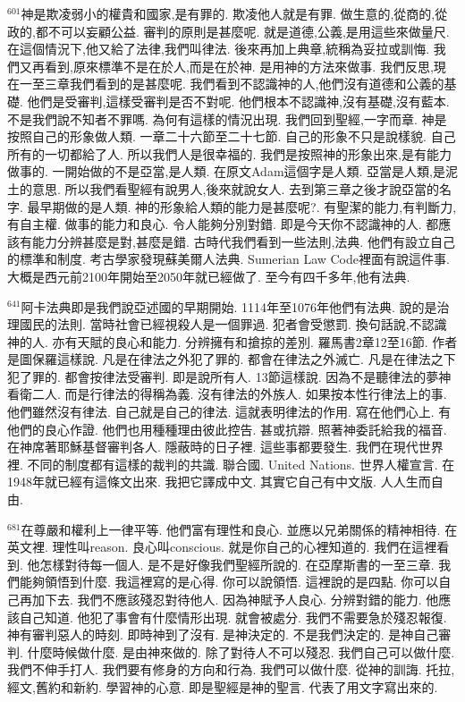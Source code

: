 \documentclass{book}
\begin{document}
$^{601}$神是欺凌弱小的權貴和國家,是有罪的.
欺凌他人就是有罪.
做生意的,從商的,從政的,都不可以妄顧公益.
審判的原則是甚麼呢.
就是道德,公義,是用這些來做量尺.
在這個情況下,他又給了法律,我們叫律法.
後來再加上典章,統稱為妥拉或訓悔.
我們又再看到,原來標準不是在於人,而是在於神.
是用神的方法來做事.
我們反思,現在一至三章我們看到的是甚麼呢.
我們看到不認識神的人,他們沒有道德和公義的基礎.
他們是受審判,這樣受審判是否不對呢.
他們根本不認識神,沒有基礎,沒有藍本.
不是我們說不知者不罪嗎.
為何有這樣的情況出現.
我們回到聖經,一字而章.
神是按照自己的形象做人類.
一章二十六節至二十七節.
自己的形象不只是說樣貌.
自己所有的一切都給了人.
所以我們人是很幸福的.
我們是按照神的形象出來,是有能力做事的.
一開始做的不是亞當,是人類.
在原文Adam這個字是人類.
亞當是人類,是泥土的意思.
所以我們看聖經有說男人,後來就說女人.
去到第三章之後才說亞當的名字.
最早期做的是人類.
神的形象給人類的能力是甚麼呢?.
有聖潔的能力,有判斷力,有自主權.
做事的能力和良心.
令人能夠分別對錯.
即是今天你不認識神的人.
都應該有能力分辨甚麼是對,甚麼是錯.
古時代我們看到一些法則,法典.
他們有設立自己的標準和制度.
考古學家發現蘇美爾人法典.
Sumerian Law Code裡面有說這件事.
大概是西元前2100年開始至2050年就已經做了.
至今有四千多年,他有法典.

$^{641}$阿卡法典即是我們說亞述國的早期開始.
1114年至1076年他們有法典.
說的是治理國民的法則.
當時社會已經視殺人是一個罪過.
犯者會受懲罰.
換句話說,不認識神的人.
亦有天賦的良心和能力.
分辨擁有和搶掠的差別.
羅馬書2章12至16節.
作者是圖保羅這樣說.
凡是在律法之外犯了罪的.
都會在律法之外滅亡.
凡是在律法之下犯了罪的.
都會按律法受審判.
即是說所有人.
13節這樣說.
因為不是聽律法的夢神看衛二人.
而是行律法的得稱為義.
沒有律法的外族人.
如果按本性行律法上的事.
他們雖然沒有律法.
自己就是自己的律法.
這就表明律法的作用.
寫在他們心上.
有他們的良心作證.
他們也用種種理由彼此控告.
甚或抗辯.
照著神委託給我的福音.
在神席著耶穌基督審判各人.
隱蔽時的日子裡.
這些事都要發生.
我們在現代世界裡.
不同的制度都有這樣的裁判的共識.
聯合國.
United Nations.
世界人權宣言.
在1948年就已經有這條文出來.
我把它譯成中文.
其實它自己有中文版.
人人生而自由.

$^{681}$在尊嚴和權利上一律平等.
他們富有理性和良心.
並應以兄弟關係的精神相待.
在英文裡.
理性叫reason.
良心叫conscious.
就是你自己的心裡知道的.
我們在這裡看到.
他怎樣對待每一個人.
是不是好像我們聖經所說的.
在亞摩斯書的一至三章.
我們能夠領悟到什麼.
我這裡寫的是心得.
你可以說領悟.
這裡說的是四點.
你可以自己再加下去.
我們不應該殘忍對待他人.
因為神賦予人良心.
分辨對錯的能力.
他應該自己知道.
他犯了事會有什麼情形出現.
就會被處分.
我們不需要急於殘忍報復.
神有審判惡人的時刻.
即時神到了沒有.
是神決定的.
不是我們決定的.
是神自己審判.
什麼時候做什麼.
是由神來做的.
除了對待人不可以殘忍.
我們自己可以做什麼.
我們不伸手打人.
我們要有修身的方向和行為.
我們可以做什麼.
從神的訓誨.
托拉,經文,舊約和新約.
學習神的心意.
即是聖經是神的聖言.
代表了用文字寫出來的.
\end{document}
